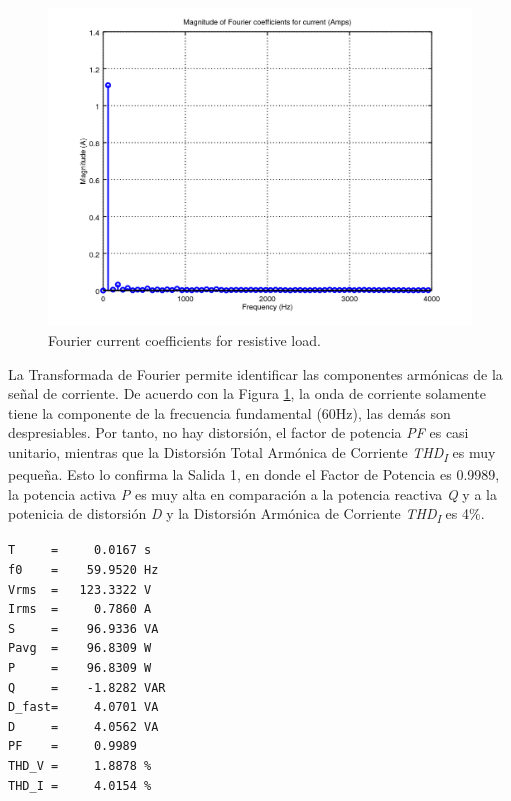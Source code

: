 \documentclass[journal]{IEEEtran}
\begin{document}
\begin{figure}[h]
\centering
\includegraphics[clip,width=\columnwidth]
{zoomed_current_furier_coefficients_resistive.png}
\caption{Fourier current coefficients for resistive load.}
\label{fourier_corrent_coefficients_resistive}
\end{figure}

La Transformada de Fourier permite identificar las 
componentes armónicas de la señal de corriente. 
De acuerdo con la Figura 
\ref{fourier_corrent_coefficients_resistive}, la onda 
de corriente solamente tiene la componente de la frecuencia 
fundamental (60Hz), las demás son despresiables. 
Por tanto, no hay distorsión, el factor de potencia 
\textit{PF} es casi unitario, mientras que la Distorsión 
Total Armónica de Corriente 
\textit{THD\textsubscript{I}} es muy pequeña. Esto lo 
confirma la Salida 1, en donde el Factor de Potencia es 
0.9989, la potencia activa \textit{P} es muy alta en 
comparación a la potencia reactiva \textit{Q} y a la 
potenicia de distorsión \textit{D} 
y la Distorsión Armónica de Corriente 
\textit{THD\textsubscript{I}} es 4\%. 


\begin{lstlisting}[caption = Carga resistiva.]
T     =     0.0167 s 
f0    =    59.9520 Hz 
Vrms  =   123.3322 V
Irms  =     0.7860 A
S     =    96.9336 VA
Pavg  =    96.8309 W 
P     =    96.8309 W 
Q     =    -1.8282 VAR 
D_fast=     4.0701 VA 
D     =     4.0562 VA 
PF    =     0.9989 
THD_V =     1.8878 %
THD_I =     4.0154 %
\end{lstlisting}
\end{document}
